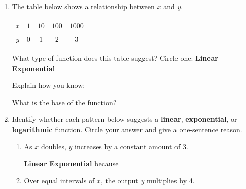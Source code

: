 \documentclass[10pt]{article}
\begin{document}
\namedateperiod

\vspace{0.15in}

\begin{enumerate}[leftmargin=1.8em, itemsep=16pt]

\item The table below shows a relationship between $x$ and $y$.

\vspace{6pt}
\begin{center}
\renewcommand{\arraystretch}{1.8}
\begin{tabular}{|c|c|c|c|c|}
\hline
\rowcolor{sky}
$x$ & $1$ & $10$ & $100$ & $1000$ \\
\hline
$y$ & $0$ & $1$  & $2$   & $3$ \\
\hline
\end{tabular}
\end{center}

\vspace{4pt}
What type of function does this table suggest? Circle one: \quad
\textbf{Linear} \quad \textbf{Exponential} \quad {}

\vspace{4pt}
Explain how you know: 

\vspace{4pt}
What is the base of the function? 

\item Identify whether each pattern below suggests a \textbf{linear}, \textbf{exponential},
      or \textbf{logarithmic} function. Circle your answer and give a one-sentence reason.

\vspace{6pt}
\begin{enumerate}[leftmargin=1.5em, itemsep=10pt, label=\alph*.]
  \item As $x$ doubles, $y$ increases by a constant amount of 3.

  \vspace{2pt}
  \textbf{Linear} \quad \textbf{Exponential} \quad {} \quad
  because 

  \item Over equal intervals of $x$, the output $y$ multiplies by 4.


\end{enumerate}
\end{enumerate}
\end{document}
